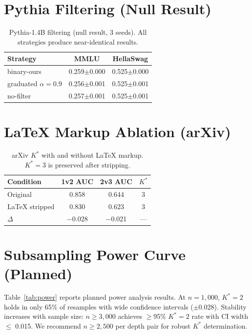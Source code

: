 \documentclass[11pt]{article}
\begin{document}
\section{Pythia Filtering (Null Result)}

\begin{table}[h]
\centering
\caption{Pythia-1.4B filtering (null result, 3 seeds). All strategies produce near-identical results.}
\label{tab:pythia_filter}
\small
\begin{tabular}{lcc}
\toprule
Strategy & MMLU & HellaSwag \\
\midrule
binary-ours & 0.259$\pm$0.000 & 0.525$\pm$0.000 \\
graduated $\alpha{=}0.9$ & 0.256$\pm$0.001 & 0.525$\pm$0.001 \\
no-filter & 0.257$\pm$0.001 & 0.525$\pm$0.001 \\
\bottomrule
\end{tabular}
\end{table}

\section{LaTeX Markup Ablation (arXiv)}

\begin{table}[h]
\centering
\caption{arXiv $K^*$ with and without LaTeX markup. $K^* = 3$ is preserved after stripping.}
\label{tab:latex_ablation}
\small
\begin{tabular}{lccc}
\toprule
Condition & 1v2 AUC & 2v3 AUC & $K^*$ \\
\midrule
Original & 0.858 & 0.644 & 3 \\
LaTeX stripped & 0.830 & 0.623 & 3 \\
$\Delta$ & $-$0.028 & $-$0.021 & --- \\
\bottomrule
\end{tabular}
\end{table}

\section{Subsampling Power Curve (Planned)}

Table~\ref{tab:power} reports planned power analysis results. At $n = 1{,}000$, $K^* = 2$ holds in only 65\% of resamples with wide confidence intervals ($\pm$0.028). Stability increases with sample size: $n \geq 3{,}000$ achieves $\geq$95\% $K^* = 2$ rate with CI width $\leq$ 0.015. We recommend $n \geq 2{,}500$ per depth pair for robust $K^*$ determination.
\end{document}
